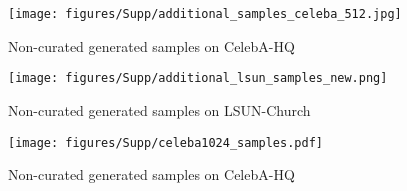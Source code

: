 \documentclass[10pt,twocolumn,letterpaper]{article}
\begin{document}
\begin{figure*}[t]
  \centering
\texttt{[image: figures/Supp/additional\_samples\_celeba\_512.jpg]}

   \caption{Non-curated generated samples on CelebA-HQ }
   \label{fig:add_cel512_samples}
\end{figure*}

\begin{figure*}[t]
  \centering
\texttt{[image: figures/Supp/additional\_lsun\_samples\_new.png]}

   \caption{Non-curated generated samples on LSUN-Church}
   \label{fig:add_lsun_samples}
\end{figure*}

\begin{figure*}[t]
  \centering
\texttt{[image: figures/Supp/celeba1024\_samples.pdf]}

   \caption{Non-curated generated samples on CelebA-HQ }
   \label{fig:add_cel1024_samples}
\end{figure*}
\end{document}
